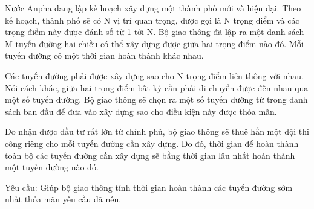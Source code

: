 Nước Anpha đang lập kế hoạch xây dựng một thành phố mới và hiện đại. Theo kế hoạch, thành phố sẽ có N vị trí quan trọng, được gọi là N trọng điểm và các trọng điểm này được đánh số từ 1 tới N. Bộ giao thông đã lập ra một danh sách M tuyến đường hai chiều có thể xây dựng được giữa hai trọng điểm nào đó. Mỗi tuyến đường có một thời gian hoàn thành khác nhau.  

   Các tuyến đường phải được xây dựng sao cho N trọng điểm liên thông với nhau. Nói cách khác, giữa hai trọng điểm bất kỳ cần phải di chuyển được đến nhau qua một số tuyến đường. Bộ giao thông sẽ chọn ra một số tuyến đường từ trong danh sách ban đầu để đưa vào xây dựng sao cho điều kiện này được thỏa mãn.  

   Do nhận được đầu tư rất lớn từ chính phủ, bộ giao thông sẽ thuê hẳn một đội thi công riêng cho mỗi tuyến đường cần xây dựng. Do đó, thời gian để hoàn thành toàn bộ các tuyến đường cần xây dựng sẽ bằng thời gian lâu nhất hoàn thành một tuyến đường nào đó.  

   Yêu cầu: Giúp bộ giao thông tính thời gian hoàn thành các tuyến đường sớm nhất thỏa mãn yêu cầu đã nêu.  

\